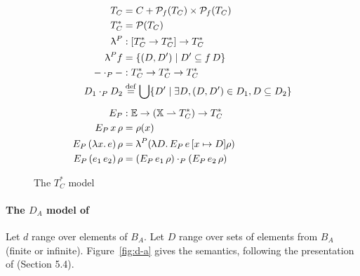 \documentclass{tufte-handout}
\newcommand{\defeq}[0]{\overset{\mathrm{def}}{=}}
\newcommand{\LAM}[1]{\lambda #1.\,}
\newcommand{\pto}[0]{\rightharpoonup}
\newcommand{\VAR}[0]{\mathbb{X}}
\begin{document}
\begin{figure}[tbp]
\begin{align*}
  T_C &= C + \mathcal{P}_f(T_C) \times \mathcal{P}_f(T_C) \\
  T^{*}_C &= \mathcal{P}(T_C) \\
  \uplambda^P &: [T^{*}_C \to T^{*}_C] \to T^{*}_C \\
  \uplambda^P f &= \{ (D,D') \mid D' \subseteq f\,D \} \\
  - \cdot_P - &: T^{*}_C \to T^{*}_C \to T^{*}_C \\
  D_1 \cdot_P D_2 &\defeq 
     \bigcup\{ D'\mid \exists D, (D,D') \in D_1, D \subseteq D_2\}\\[1ex]
\EP&: \mathbb{E} \to (\VAR\pto T^{*}_C) \to T^{*}_C\\
\PSEM{ x }\rho &= \rho(x) \\
\PSEM{ (\LAM{x} e) }\rho &= \uplambda^P (\uplambda D.\, \PSEM{e}[x\mapsto D]\rho) \\
\PSEM{ (e_1\,e_2) }\rho &= (\PSEM{ e_1 }\rho) \cdot_P (\PSEM{ e_2 }\rho)
\end{align*}
\caption{The $T^{*}_C$ model}
\label{fig:t-c}
\end{figure}


\paragraph{The $D_A$ model of \citet{Engeler:1981aa}}
\label{sec:d-a}

\newcommand{\EE}[0]{E_E}
\newcommand{\ESEM}[1]{\EE\, #1 \,}


  Let $d$ range over elements of $B_A$.  Let $D$ range over sets of
  elements from $B_A$ (finite or infinite).  Figure~\ref{fig:d-a}
  gives the semantics, following the presentation of
  \citet{barendregt84:_lambda_calculus} (Section 5.4).
  
\end{document}
